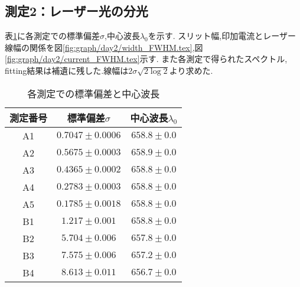 \subsection{測定2：レーザー光の分光}
表\ref{tab:sigma_center}に各測定での標準偏差$\sigma$,中心波長$\lambda_0$を示す.
スリット幅,印加電流とレーザー線幅の関係を図\ref{fig:graph/day2/width_FWHM.tex},図\ref{fig:graph/day2/current_FWHM.tex}示す.
また各測定で得られたスペクトル, fitting結果は補遺に残した.線幅は$2\sigma\sqrt{2\log2}$より求めた.
\begin{table}[h]
\caption{各測定での標準偏差と中心波長}
\label{tab:sigma_center}
\centering
\begin{tabular}{c|cc}
\hline
測定番号&標準偏差$\sigma$&中心波長$\lambda_0$\\
\hline \hline
A1&$0.7047\pm0.0006$& $658.8\pm0.0$\\
A2&$0.5675\pm0.0003$& $658.9\pm0.0$\\
A3&$0.4365\pm0.0002$& $658.8\pm0.0$\\
A4&$0.2783\pm0.0003$& $658.8\pm0.0$\\
A5&$0.1785\pm0.0018$& $658.8\pm0.0$\\
B1&$1.217\pm0.001$& $658.8\pm0.0$\\
B2&$5.704\pm0.006$& $657.8\pm0.0$\\
B3&$7.575\pm0.006$& $657.2\pm0.0$\\
B4&$8.613\pm0.011$& $656.7\pm0.0$\\
\hline
\end{tabular}
\end{table}
